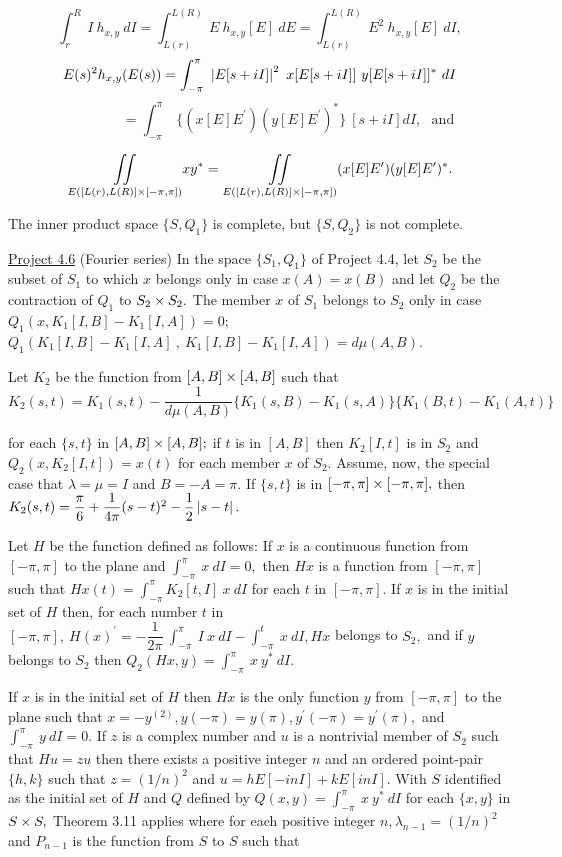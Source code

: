 \[
\int_{r}^{R}~I~h_{x,y}~dI = \int_{L(r)}^{L(R)}~E~h_{x,y}[E]~dE = \int_{L(r)}^{L(R)}~E^{2}~h_{x,y}[E]~dI,
\]
\[
E(s)^{2}h_{x,y}(E(s))   =  \int_{-\pi}^{\pi}~\left|E[s+iI]\right|^{2}~x[E[s+iI]]~y[E[s+iI]]^{*}~dI
\]
\[
\qquad\qquad\quad = \int_{-\pi}^{\pi}~\{(x[E]E^{\prime})(y[E]E^{\prime})^{*}\}~[s+iI] dI, \text{~~and ~~}
\]

\[
\underset{E([L(r),L(R)] \times [-\pi,\pi])}{\iint}xy^{*} = \underset{E([L(r),L(R)] \times [-\pi,\pi])}{\iint}(x[E]E^{\prime})(y[E]E^{\prime})^{*}.
\]

The inner product space $\{S,Q_{1}\}$ is complete, but $\{S,Q_{2}\}$ is not complete.\nl

\ul{Project 4.6}  (Fourier series)  In the space $\{S_{1},Q_{1}\}$ of Project 4.4, let $S_{2}$ be the subset of $S_{1}$ to which $x$ belongs only in case $x(A) = x(B)$ and let $Q_{2}$ be the contraction of $Q_{1}$ to $S_{2}\times S_{2}.$  The member $x$ of $S_{1}$ belongs to $S_{2}$ only in case $Q_{1}(x,K_{1}[I,B] - K_{1}[I,A]) = 0;$~$Q_{1}(K_{1}[I,B] - K_{1}[I,A]~,~K_{1}[I,B]-K_{1}[I,A] ) = d\mu(A,B).$ \nl

Let $K_{2}$ be the function from $[A,B] \times [A,B]$ such that
\[
K_{2}(s,t) = K_{1}(s,t) - \dfrac{1}{d\mu(A,B)}\{K_{1}(s,B) - K_{1}(s,A)\}\{K_{1}(B,t)- K_{1}(A,t)\}
\]

for each $\{s,t\}$ in $[A,B] \times [A,B];$  if $t$ is in $[A,B]$ then $K_{2}[I,t]$ is in $S_{2}$ and $Q_{2}(x,K_{2}[I,t]) = x(t)$ for each member $x$ of $S_{2}.$  Assume, now, the special case that $\lambda = \mu = I$ and $B = -A = \pi.$  If $\{s,t\}$ is in $[-\pi, \pi] \times [-\pi, \pi],$ then $K_{2}(s,t) = \dfrac{\pi}{6} + \dfrac{1}{4\pi}(s-t)^{2} - \dfrac{1}{2}\left|s-t\right|.$\nl

Let $H$ be the function defined as follows:  If $x$ is a continuous function from $[-\pi,\pi]$ to the plane and $\int_{-\pi}^{\pi}~x~dI = 0,$ then $Hx$ is a function from $[-\pi,\pi]$ such that $Hx(t) = \int_{-\pi}^{\pi} K_{2}[t,I]~x~dI$ for each $t$ in $[-\pi, \pi].$   If $x$ is in the initial set of $H$ then, for each number $t$ in $[-\pi,\pi],~H(x)^{\prime} = - \dfrac{1}{2\pi}~\int_{-\pi}^{\pi}~I~x~dI - \int_{-\pi}^{t}~x~dI, Hx$ belongs to $S_{2},$ and if $y$ belongs to $S_{2}$ then $Q_{2}(Hx,y) = \int_{-\pi}^{\pi}~x~y^{*}~dI.$ \nl

If $x$ is in the initial set of $H$ then $Hx$ is the only function $y$ from $[-\pi,\pi]$ to the plane such that $x = -y^{(2)}, y(-\pi) = y(\pi), y^{\prime}(-\pi) = y^{\prime}(\pi),$ and $\int_{-\pi}^{\pi}~y~dI = 0.$   If $z$ is a complex number and $u$ is a nontrivial member of $S_{2}$ such that $Hu = zu$ then there exists a positive integer $n$ and an ordered point-pair $\{h,k\}$ such that $z = (1/n)^{2}$ and $u = hE[-inI] + kE[inI].$  With $S$ identified as the initial set of $H$ and $Q$ defined by $Q(x,y) = \int_{-\pi}^{\pi}~x~y^{*}~dI$ for each $\{x,y\}$ in $S \times S,$ Theorem 3.11 applies where for each positive integer $n, \lambda_{n-1} = (1/n)^{2}$ and $P_{n-1}$ is the function from $S$ to $S$ such that \nl

